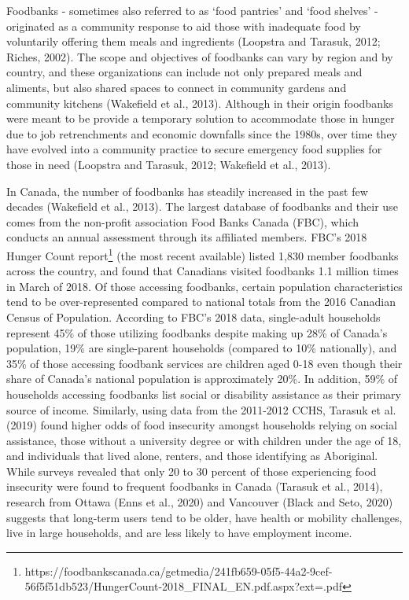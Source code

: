 \documentclass[]{elsarticle} %
\begin{document}
Foodbanks - sometimes also referred to as `food pantries' and `food
shelves' - originated as a community response to aid those with
inadequate food by voluntarily offering them meals and ingredients
(Loopstra and Tarasuk, 2012; Riches, 2002). The scope and objectives of
foodbanks can vary by region and by country, and these organizations can
include not only prepared meals and aliments, but also shared spaces to
connect in community gardens and community kitchens (Wakefield et al.,
2013). Although in their origin foodbanks were meant to be provide a
temporary solution to accommodate those in hunger due to job
retrenchments and economic downfalls since the 1980s, over time they
have evolved into a community practice to secure emergency food supplies
for those in need (Loopstra and Tarasuk, 2012; Wakefield et al., 2013).

In Canada, the number of foodbanks has steadily increased in the past
few decades (Wakefield et al., 2013). The largest database of foodbanks
and their use comes from the non-profit association Food Banks Canada
(FBC), which conducts an annual assessment through its affiliated
members. FBC's 2018 Hunger Count report\footnote{https://foodbankscanada.ca/getmedia/241fb659-05f5-44a2-9cef-56f5f51db523/HungerCount-2018\_FINAL\_EN.pdf.aspx?ext=.pdf}
(the most recent available) listed 1,830 member foodbanks across the
country, and found that Canadians visited foodbanks 1.1 million times in
March of 2018. Of those accessing foodbanks, certain population
characteristics tend to be over-represented compared to national totals
from the 2016 Canadian Census of Population. According to FBC's 2018
data, single-adult households represent 45\% of those utilizing
foodbanks despite making up 28\% of Canada's population, 19\% are
single-parent households (compared to 10\% nationally), and 35\% of
those accessing foodbank services are children aged 0-18 even though
their share of Canada's national population is approximately 20\%. In
addition, 59\% of households accessing foodbanks list social or
disability assistance as their primary source of income. Similarly,
using data from the 2011-2012 CCHS, Tarasuk et al. (2019) found higher
odds of food insecurity amongst households relying on social assistance,
those without a university degree or with children under the age of 18,
and individuals that lived alone, renters, and those identifying as
Aboriginal. While surveys revealed that only 20 to 30 percent of those
experiencing food insecurity were found to frequent foodbanks in Canada
(Tarasuk et al., 2014), research from Ottawa (Enns et al., 2020) and
Vancouver (Black and Seto, 2020) suggests that long-term users tend to
be older, have health or mobility challenges, live in large households,
and are less likely to have employment income.
\end{document}
